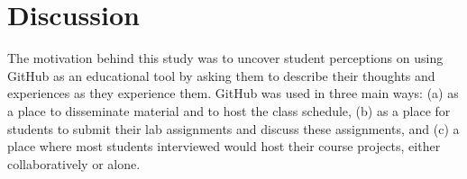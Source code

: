 






\section{Discussion}
The motivation behind this study was to uncover student perceptions on using GitHub as an educational tool by asking them to describe their thoughts and experiences as they experience them. GitHub was used in three main ways: (a) as a place to disseminate material and to host the class schedule, (b) as a place for students to submit their lab assignments and discuss these assignments, and (c) a place where most students interviewed would host their course projects, either collaboratively or alone.

